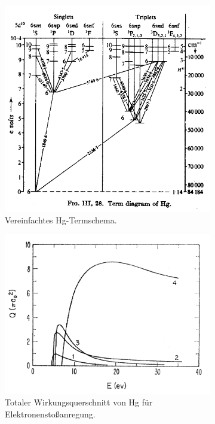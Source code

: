     \begin{figure}[H]
        \centering
        \begin{subfigure}{0.4\textwidth}
            \includegraphics[width=\linewidth]{figs/Hertz_Termdiagramm_Hg.png}
            \caption{Vereinfachtes Hg-Termschema. \cite{Hertz_Termschema_Hg-Abb}}
        \end{subfigure}
        \hspace{1cm}
        \begin{subfigure}{0.45\textwidth}
            \includegraphics[width=\linewidth]{figs/Hertz_Wirkungsquerschnitte.png}
            \caption{Totaler Wirkungsquerschnitt von Hg für Elektronenstoßanregung. \cite{Hertz_Wirkungsquerschnitt-Abb}}
        \end{subfigure}
        \caption{}
    \end{figure}